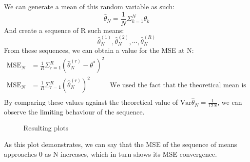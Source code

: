 We can generate a mean of this random variable as such:
\begin{equation}
    \hat{\theta}_N = \frac{1}{N}\Sigma^{N}_{k=1}\theta_k
\end{equation}
And create a sequence of R such means:
\begin{equation}
    \hat{\theta}^{(1)}_N, \hat{\theta}^{(2)}_N, \cdots , \hat{\theta}^{(R)}_N
\end{equation}
From these sequences, we can obtain a value for the MSE at N:
\begin{equation}
    \begin{aligned}
        \text{MSE}_N &= \frac{1}{R}\Sigma^{R}_{r=1}(\hat{\theta}^{(r)}_N - \theta^{*})^{2}&\mbox{}\\[1.25ex]
        \text{MSE}_N &=\frac{1}{R}\Sigma^{R}_{r=1}(\hat{\theta}_N^{(r)})^{2} &\mbox{We used the fact that the theoretical mean is equal to 0}\\[1.25ex]
    \end{aligned}
\end{equation}
\clearpage
By comparing these values against the theoretical value of $\text{Var}\hat{\theta}_N = \frac{1}{12N}$, we can observe the limiting behaviour of the sequence.


\begin{figure}[h!]
    \begin{center}
    \caption{Resulting plots}
    \end{center}
\end{figure}

As this plot demonstrates, we can say that the MSE of the sequence of means approaches 0 as N increases, which in turn shows its MSE convergence.



